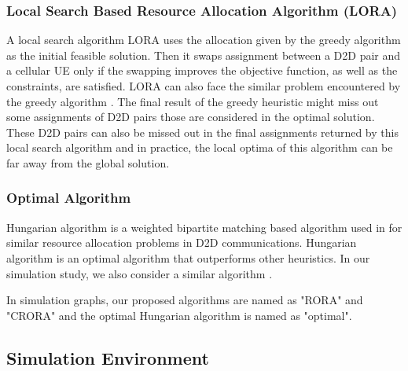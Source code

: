 \documentclass[times]{dacauth}
\begin{document}
\subsubsection{Local Search Based Resource Allocation Algorithm (LORA)} 
\noindent
A local search algorithm LORA \cite {lora} uses the allocation given by the greedy algorithm \cite{zulhasnine} as the initial feasible solution. Then it swaps assignment between a D2D pair and a cellular UE only if the swapping improves the objective function, as well as the constraints,  are satisfied. LORA can also face the similar problem encountered by the greedy algorithm \cite{zulhasnine}. The final result of the greedy heuristic might miss out some assignments of D2D pairs those are considered in the optimal solution. These D2D pairs can also be missed out in the final assignments returned by this local search algorithm and in practice, the local optima of this algorithm can be far away from the global solution.


\subsubsection{Optimal Algorithm}

\noindent
Hungarian algorithm \cite{hungarian} is a weighted bipartite matching based algorithm used in \cite {zhang, feng, ccnc} for similar resource allocation problems in D2D communications. Hungarian algorithm is an optimal algorithm that outperforms other heuristics. In our simulation study, we also consider a similar algorithm \cite{hungarian}.
\par
\noindent
In simulation graphs, our proposed algorithms are named as "RORA" and "CRORA" and the optimal Hungarian algorithm is named as "optimal".


\subsection{Simulation Environment}
\end{document}
